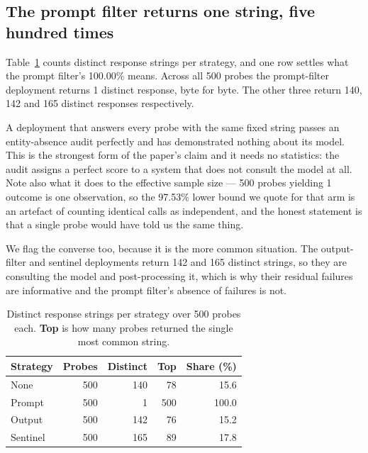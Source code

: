 \documentclass[journal]{IEEEtran}
\theoremstyle{definition}
\newcommand{\Nper}{500}
\newcommand{\PfRate}{100.00}
\newcommand{\PfLower}{97.53}
\newcommand{\PPfUniq}{1}
\newcommand{\PNoneUniq}{140}
\newcommand{\PSenUniq}{165}
\newcommand{\POfUniq}{142}
\begin{document}
\subsection{The prompt filter returns one string, five hundred times}
\label{sec:onestring}

Table~\ref{tab:respdiv} counts distinct response strings per strategy, and one
row settles what the prompt filter's \PfRate\% means. Across all \Nper{} probes
the prompt-filter deployment returns \PPfUniq{} distinct response, byte for byte.
The other three return \PNoneUniq, \POfUniq{} and \PSenUniq{} distinct responses
respectively.

A deployment that answers every probe with the same fixed string passes an
entity-absence audit perfectly and has demonstrated nothing about its model. This
is the strongest form of the paper's claim and it needs no statistics: the audit
assigns a perfect score to a system that does not consult the model at all. Note
also what it does to the effective sample size --- \Nper{} probes yielding
\PPfUniq{} outcome is one observation, so the \PfLower\% lower bound we quote for
that arm is an artefact of counting identical calls as independent, and the
honest statement is that a single probe would have told us the same thing.

We flag the converse too, because it is the more common situation. The
output-filter and sentinel deployments return \POfUniq{} and \PSenUniq{} distinct
strings, so they are consulting the model and post-processing it, which is why
their residual failures are informative and the prompt filter's absence of
failures is not.

\begin{table}[t]
\caption{Distinct response strings per strategy over \Nper{} probes each.
\textbf{Top} is how many probes returned the single most common string.}
\label{tab:respdiv}
\centering
\footnotesize
\setlength{\tabcolsep}{5pt}
\begin{tabular}{@{}lrrrr@{}}
\toprule
Strategy & Probes & Distinct & Top & Share (\%) \\
\midrule
None & 500 & 140 & 78 & 15.6 \\
Prompt & 500 & 1 & 500 & 100.0 \\
Output & 500 & 142 & 76 & 15.2 \\
Sentinel & 500 & 165 & 89 & 17.8 \\
\bottomrule
\end{tabular}
\end{table}
\end{document}
